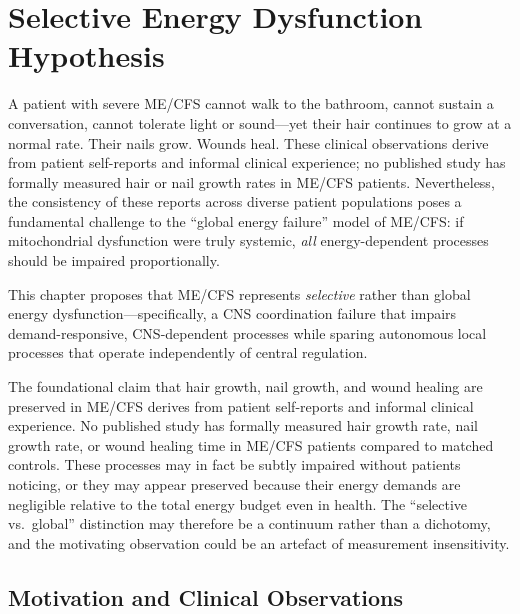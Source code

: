 
\section{Selective Energy Dysfunction Hypothesis}
\label{sec:selective-dysfunction}

\begin{open_question}
A patient with severe ME/CFS cannot walk to the bathroom, cannot sustain a conversation, cannot tolerate light or sound---yet their hair continues to grow at a normal rate. Their nails grow. Wounds heal. These clinical observations derive from patient self-reports and informal clinical experience; no published study has formally measured hair or nail growth rates in ME/CFS patients. Nevertheless, the consistency of these reports across diverse patient populations poses a fundamental challenge to the ``global energy failure'' model of ME/CFS: if mitochondrial dysfunction were truly systemic, \emph{all} energy-dependent processes should be impaired proportionally.

This chapter proposes that ME/CFS represents \emph{selective} rather than global energy dysfunction---specifically, a CNS coordination failure that impairs demand-responsive, CNS-dependent processes while sparing autonomous local processes that operate independently of central regulation.
\end{open_question}

\begin{limitation}
The foundational claim that hair growth, nail growth, and wound healing are preserved in ME/CFS derives from patient self-reports and informal clinical experience. No published study has formally measured hair growth rate, nail growth rate, or wound healing time in ME/CFS patients compared to matched controls. These processes may in fact be subtly impaired without patients noticing, or they may appear preserved because their energy demands are negligible relative to the total energy budget even in health. The ``selective vs.\ global'' distinction may therefore be a continuum rather than a dichotomy, and the motivating observation could be an artefact of measurement insensitivity.
\end{limitation}

\subsection{Motivation and Clinical Observations}

